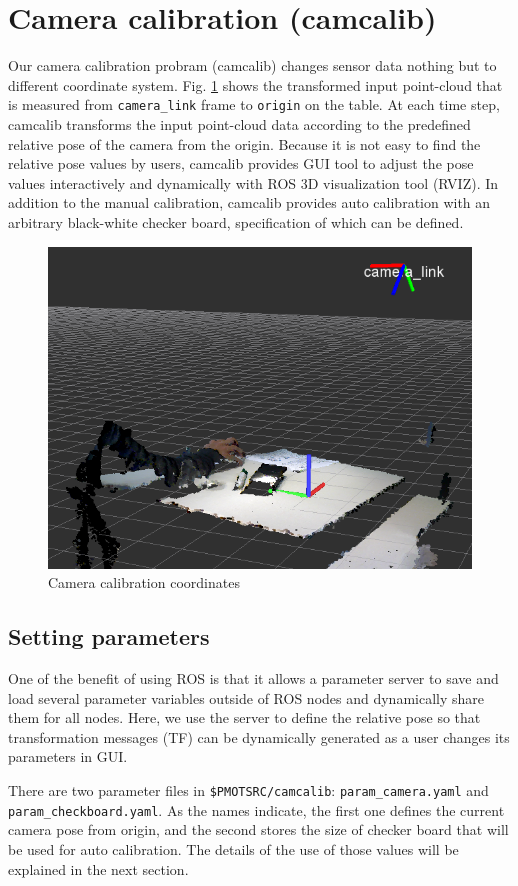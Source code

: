 \documentclass[a4paper,twoside, openright,12pt]{report}
\begin{document}
\section{Camera calibration (camcalib)}

Our camera calibration probram (camcalib) changes sensor data nothing but to different coordinate system. 
Fig. \ref{fig:camcalib} shows the transformed input point-cloud that is measured from \verb|camera_link| frame to \verb|origin| on the table.
At each time step, camcalib transforms the input point-cloud data according to the predefined relative pose of the camera from the origin. 
Because it is not easy to find the relative pose values by users, camcalib provides GUI tool to adjust the pose values interactively and dynamically with ROS 3D visualization tool (RVIZ). 
In addition to the manual calibration, camcalib provides auto calibration with an arbitrary black-white checker board, specification of which can be defined.
\begin{figure}[b]
	\centering
	\includegraphics[width=0.45\linewidth]{fig/camcalib.png}
	\caption{Camera calibration coordinates}
	\label{fig:camcalib}
\end{figure}

\subsection{Setting parameters}
One of the benefit of using ROS is that it allows a parameter server to save and load several parameter variables outside of ROS nodes and dynamically share them for all nodes.
Here, we use the server to define the relative pose so that transformation messages (TF) can be dynamically generated as a user changes its parameters in GUI.

There are two parameter files in \verb|$PMOTSRC/camcalib|: \verb|param_camera.yaml| and \verb|param_checkboard.yaml|.
As the names indicate, the first one defines the current camera pose from origin, and the second stores the size of checker board that will be used for auto calibration. The details of the use of those values will be explained in the next section.
\end{document}
